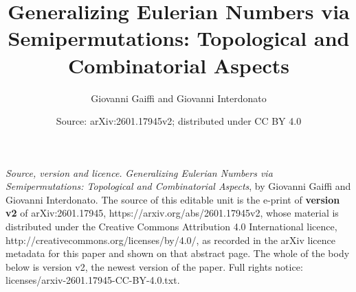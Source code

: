 \documentclass[10pt,a4paper]{amsart}
\theoremstyle{definition}
\theoremstyle{remark}
\numberwithin{equation}{section}
\begin{document}
\title{Generalizing Eulerian Numbers via Semipermutations: Topological and Combinatorial Aspects}
\author{Giovanni Gaiffi and Giovanni Interdonato}
\date{Source: arXiv:2601.17945v2; distributed under CC BY 4.0}
\maketitle
\noindent\emph{Source, version and licence.} \emph{Generalizing Eulerian Numbers via Semipermutations: Topological and Combinatorial Aspects}, by Giovanni Gaiffi and Giovanni Interdonato. The source of this editable unit is the e-print of \textbf{version v2} of arXiv:2601.17945, https://arxiv.org/abs/2601.17945v2, whose material is distributed under the Creative Commons Attribution 4.0 International licence, http://creativecommons.org/licenses/by/4.0/, as recorded in the arXiv licence metadata for this paper and shown on that abstract page. The whole of the body below is version v2, the newest version of the paper. Full rights notice: licenses/arxiv-2601.17945-CC-BY-4.0.txt.\par\smallskip
\end{document}
